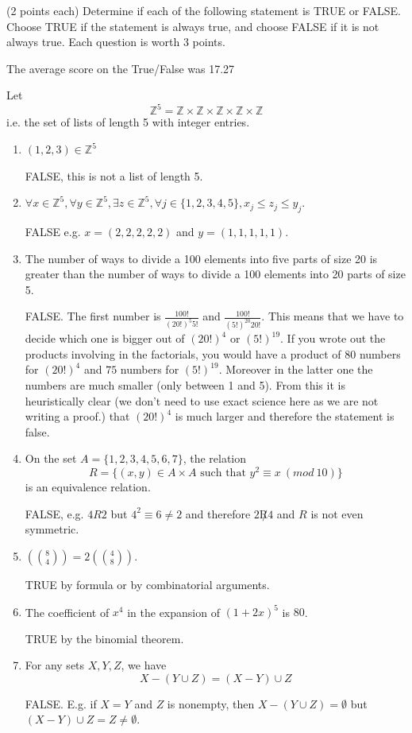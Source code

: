 \documentclass[12pt]{article}
\begin{document}
(2 points each) Determine if each of the following statement is TRUE or FALSE.\\Choose TRUE if the statement is always true, and choose FALSE if it is not always true. Each question is worth 3 points.

\vspace{0.2cm}

\noindent
The average score on the True/False was 17.27

Let
\[
\mathbb{Z}^5=\mathbb{Z}\times\mathbb{Z}\times\mathbb{Z}\times\mathbb{Z}\times \mathbb{Z}
\]
i.e. the set of lists of length 5 with integer entries.
\begin{enumerate}
\item $(1,2,3)\in\mathbb{Z}^5$  

FALSE, this is not a list of length 5.
\item $\forall x\in \mathbb{Z}^5,\forall y\in\mathbb{Z}^5,\exists z\in\mathbb{Z}^5,\forall j\in \{1,2,3,4,5\}, x_j\leq z_j\leq y_j$.

FALSE e.g. $x=(2,2,2,2,2)$ and $y=(1,1,1,1,1)$.
\item The number of ways to divide a 100 elements into five parts of size 20 is greater than the number of ways to divide a 100 elements into 20 parts of size 5.

FALSE. The first number is $\frac{100!}{(20!)^5 5!}$ and $\frac{100!}{(5!)^{20}20!}$. This means that we have to decide which one is bigger out of $(20!)^4$ or $(5!)^{19}$. If you wrote out the products involving in the factorials, you would have a product of $80$ numbers for $(20!)^4$ and $75$ numbers for $(5!)^{19}$. Moreover in the latter one the numbers are much smaller (only between 1 and 5). From this it is heuristically clear (we don't need to use exact science here as we are not writing a proof.) that $(20!)^4$ is much larger and therefore the statement is false.

 
\item On the set $A=\{1,2,3,4,5,6,7\}$, the relation 
\[
R=\{(x,y)\in A\times A\textrm{ such that }y^2 \equiv x~(mod~10)\}
\]
is an equivalence relation. 

FALSE, e.g. $4R2$ but $4^2 \equiv 6\neq 2$ and therefore $2\not R 4$ and $R$ is not even symmetric.

\item $\left(\binom{8}{4}\right)=2\left(\binom{4}{8}\right)$. 

TRUE by formula or by combinatorial arguments.

\item The coefficient of $x^4$ in the expansion of $(1+2x)^5$ is $80$.

TRUE by the binomial theorem.

\item For any sets $X,Y,Z$, we have
\[
X-(Y\cup Z)=(X-Y)\cup Z
\]

FALSE. E.g. if $X=Y$ and $Z$ is nonempty, then $X-(Y\cup Z)=\emptyset$ but $(X-Y)\cup Z=Z\neq\emptyset$. 


\end{enumerate}
\end{document}
